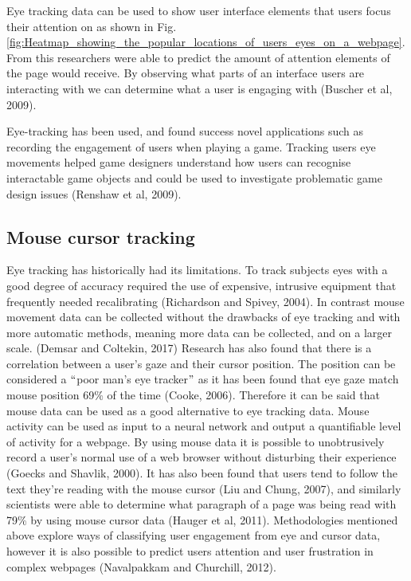 \documentclass[12pt]{article}
\renewcommand{\_}{\kern-1.5pt\textunderscore\kern-1.5pt}
\begin{document}
\vspace{\baselineskip}
Eye tracking data can be used to show user interface elements that users focus their attention on as shown in Fig. \ref{fig:Heatmap_showing_the_popular_locations_of_users_eyes_on_a_webpage}. From this researchers were able to predict the amount of attention elements of the page would receive. By observing what parts of an interface users are interacting with we can determine what a user is engaging with (Buscher et al, 2009).\par


\vspace{\baselineskip}
Eye-tracking has been used, and found success novel applications such as recording the engagement of users when playing a game. Tracking users eye movements helped game designers understand how users can recognise interactable game objects and could be used to investigate problematic game design issues (Renshaw et al, 2009).\par

\subsection*{Mouse cursor tracking}
Eye tracking has historically had its limitations. To track subjects eyes with a good degree of accuracy required the use of expensive, intrusive equipment that frequently needed recalibrating (Richardson and Spivey, 2004). In contrast mouse movement data can be collected without the drawbacks of eye tracking and with more automatic methods, meaning more data can be collected, and on a larger scale. (Demsar and Coltekin, 2017) Research has also found that there is a correlation between a user's gaze and their cursor position. The position can be considered a $``$poor man’s eye tracker$"$  as it has been found that eye gaze match mouse position 69$\%$  of the time (Cooke, 2006). Therefore it can be said that mouse data can be used as a good alternative to eye tracking data. Mouse activity can be used as input to a neural network and output a quantifiable level of activity for a webpage. By using mouse data it is possible to unobtrusively record a user's normal use of a web browser without disturbing their experience (Goecks and Shavlik, 2000). It has also been found that users tend to follow the text they’re reading with the mouse cursor (Liu and Chung, 2007), and similarly scientists were able to determine what paragraph of a page was being read with 79$\%$  by using mouse cursor data (Hauger et al, 2011). Methodologies mentioned above explore ways of classifying user engagement from eye and cursor data, however it is also possible to predict users attention and user frustration in complex webpages (Navalpakkam and Churchill, 2012).\par
\end{document}
